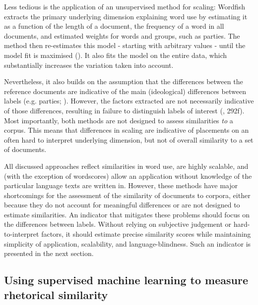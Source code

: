 \documentclass{article}
\begin{document}
Less tedious is the application of an unsupervised method for scaling: Wordfish extracts the primary underlying dimension explaining word use by estimating it as a function of the length of a document, the frequency of a word in all documents, and estimated weights for words and groups, such as parties. The method then re-estimates this model - starting with arbitrary values - until the model fit is maximised (\cite{Slapin2008}). It also fits the model on the entire data, which substantially increases the variation taken into account.\par

Nevertheless, it also builds on the assumption that the differences between the reference documents are indicative of the main (ideological) differences between labels (e.g. parties; \cite{Lowe2008}). However, the factors extracted are not necessarily indicative of those differences, resulting in failure to distinguish labels of interest (\cite{Grimmer2013TextASData}, 292f). Most importantly, both methods are not designed to assess similarities \textit{to} a corpus. This means that differences in scaling are indicative of placements on an often hard to interpret underlying dimension, but not of overall similarity to a set of documents.\par

All discussed approaches reflect similarities in word use, are highly scalable, and (with the exception of wordscores) allow an application without knowledge of the particular language texts are written in. However, these methods have major shortcomings for the assessment of the similarity of documents to corpora, either because they do not account for meaningful differences or are not designed to estimate similarities. An indicator that mitigates these problems should focus on the differences between labels. Without relying on subjective judgement or hard-to-interpret factors, it should estimate precise similarity scores while maintaining simplicity of application, scalability, and language-blindness. Such an indicator is presented in the next section.\par

\subsection{Using supervised machine learning to measure rhetorical similarity}
\label{sec:method}
\end{document}
